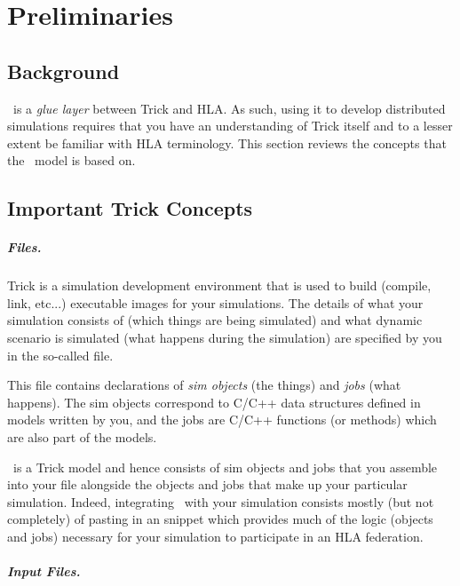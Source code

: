 \chapter{Preliminaries}\label{sec:preliminaries}

\section{Background}

\TrickHLA\ is a {\em glue layer} between Trick and HLA.
As such, using it to develop distributed simulations requires
that you have an understanding of Trick itself and to a lesser extent
be familiar with HLA terminology.
This section reviews the concepts that the \TrickHLA\ model is based on.

\section{Important Trick Concepts}

\paragraph{{\sdefine} Files.}
Trick is a simulation development environment that is used to build (compile, link, etc...)
executable images for your simulations.
The details of what your simulation consists of (which things are being simulated)
and what dynamic scenario is simulated (what happens during the simulation)
are specified by you in the so-called \sdefine file.

This file contains declarations of {\em sim objects} (the things)
and {\em jobs} (what happens).
The sim objects correspond to C/C++ data structures defined in models written by you,
and the jobs are C/C++ functions (or methods) which are also part of the models.

\TrickHLA\ is a Trick model and hence consists of sim objects and jobs that you assemble
into your \sdefine file alongside the objects and jobs that make up your particular
simulation.
Indeed, integrating \TrickHLA\ with your simulation consists mostly
(but not completely)
of pasting in an \sdefine snippet which provides much of the logic
(objects and jobs)
necessary for your simulation to participate in an HLA federation.

\paragraph{Input Files.}

